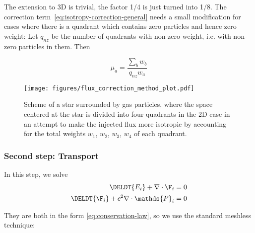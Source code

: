 The extension to 3D is trivial, the factor 1/4 is just turned into 1/8. The 
correction term~\ref{eq:isotropy-correction-general} needs a small modification 
for cases where there is a quadrant which contains zero particles and hence 
zero weight: Let $q_{nz}$ be the number of quadrants with non-zero weight, i.e.
with non-zero particles in them. Then

\begin{equation}
	\mu_a = \frac{\sum_b w_b}{q_{nz} w_a} \label{eq:isotropy-correction-with-zero}
\end{equation}


\begin{figure}
	\centering
	\texttt{[image: figures/flux\_correction\_method\_plot.pdf]}%
	\label{fig:flux-injection-correction-method}
	\caption{
		Scheme of a star surrounded by gas particles, where the space centered at the 
        star is divided into four quadrants in the 2D case in an attempt to make the 
        injected flux more isotropic by accounting for the total weights $w_1$, $w_2$, 
        $w_3$, $w_4$ of each quadrant.
	}
\end{figure}
























\subsubsection{Second step: Transport}\label{chap:transport-step}

In this step, we solve
\begin{align}
		\DELDT{E_i} + \nabla \cdot \F_i &= 0 \label{eq:homogenized-dEdt}\\
		\DELDT{\F_i} + c^2 \nabla \cdot \mathds{P}_i &= 0 \label{eq:homogenized-dFdt}
\end{align}

They are both in the form \ref{eq:conservation-law}, so we use the standard meshless technique:


